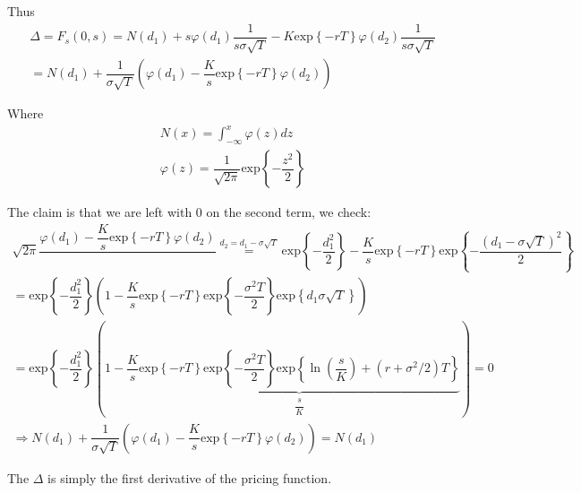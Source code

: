 \noindent Thus
\begin{equation*}
  \begin{gathered}
    \Delta = F_s(0,s) = N(d_1)+s\varphi(d_1)\dfrac{1}{s\sigma\sqrt{T}}-K\text{exp}\left\{-rT\right\}\varphi(d_2)\dfrac{1}{s\sigma\sqrt{T}}\\
    = N(d_1) +\dfrac{1}{\sigma\sqrt{T}}\left(\varphi(d_1)-\dfrac{K}{s}\text{exp}\left\{-rT\right\}\varphi(d_2)\right)
  \end{gathered}
\end{equation*}\par
\noindent Where
\begin{equation*}
  \begin{gathered}
    N(x) = \int_{-\infty}^{x}\varphi(z)dz\\
    \varphi(z) = \dfrac{1}{\sqrt{2\pi}}\text{exp}\left\{-\dfrac{z^2}{2}\right\}
  \end{gathered}
\end{equation*}
\par\bigskip
\noindent The claim is that we are left with 0 on the second term, we check:
\begin{equation*}
  \begin{gathered}
    \sqrt{2\pi}\dfrac{\varphi(d_1)-\dfrac{K}{s}\text{exp}\left\{-rT\right\}\varphi(d_2)}{} \stackrel{d_2 = d_1-\sigma\sqrt{T}}{=} \text{exp}\left\{-\dfrac{d_1^2}{2}\right\}-\dfrac{K}{s}\text{exp}\left\{-rT\right\}\text{exp}\left\{-\dfrac{\left(d_1-\sigma\sqrt{T}\right)^2}{2}\right\}\\
    = \text{exp}\left\{-\dfrac{d_1^2}{2}\right\}\left(1-\dfrac{K}{s}\text{exp}\left\{-rT\right\}\text{exp}\left\{-\dfrac{\sigma^2T}{2}\right\}\text{exp}\left\{d_1\sigma\sqrt{T}\right\}\right)\\
    = \text{exp}\left\{-\dfrac{d_1^2}{2}\right\}\left(1-\dfrac{K}{s}\underbrace{\text{exp}\left\{-rT\right\}\text{exp}\left\{-\dfrac{\sigma^2T}{2}\right\}\text{exp}\left\{\ln{\left(\dfrac{s}{K}\right)}+(r+\sigma^2/2)T\right\}}_{\substack{\dfrac{s}{K}}}\right) = 0\\
    \Rightarrow N(d_1) +\dfrac{1}{\sigma\sqrt{T}}\left(\varphi(d_1)-\dfrac{K}{s}\text{exp}\left\{-rT\right\}\varphi(d_2)\right) = N(d_1)
  \end{gathered}
\end{equation*}
\par\bigskip
\noindent The $\Delta$ is simply the first derivative of the pricing function.
